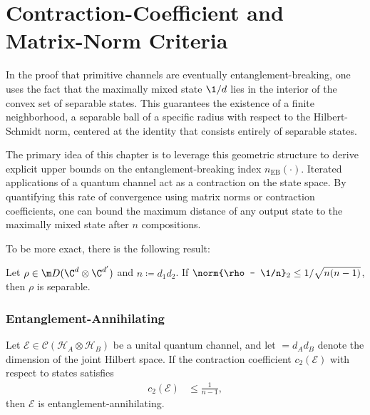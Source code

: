 \section{Contraction-Coefficient and Matrix-Norm Criteria}\label{sec:result:contraction}
In the proof that primitive channels are eventually entanglement-breaking, one uses the fact that the maximally mixed state ${\1}/{d}$ lies in the interior of the convex set of separable states. This guarantees the existence of a finite neighborhood, a separable ball of a specific radius with respect to the Hilbert-Schmidt norm, centered at the identity that consists entirely of separable states. 

The primary idea of this chapter is to leverage this geometric structure to derive explicit upper bounds on the entanglement-breaking index $n_{\text{EB}}(\cdot)$. Iterated applications of a quantum channel act as a contraction on the state space. By quantifying this rate of convergence using matrix norms or contraction coefficients, one can bound the maximum distance of any output state to the maximally mixed state after $n$ compositions.

To be more exact, there is the following result:
\begin{prop}\label{prop:ball}
    Let $\rho \in \m D(\C^d\otimes \C^{d'})$ and $n\coloneqq d_1 d_2$. If $\norm{\rho - \1/n}_2 \leq 1/\sqrt{n(n-1)}$, then $\rho$ is separable.
\end{prop}
\subsubsection{Entanglement-Annihilating}
\begin{prop}
Let $\mathcal{E} \in \mathcal{C}(\mathcal{H}_A \otimes \mathcal{H}_B)$ be a unital quantum channel, and let $ = d_A d_B$ denote the dimension of the joint Hilbert space. If the contraction coefficient $c_2(\mathcal{E})$ with respect to states satisfies
\begin{align*}
    c_2(\mathcal{E}) &\le \frac{1}{n - 1},
\end{align*}
then $\mathcal{E}$ is entanglement-annihilating.
\end{prop}

